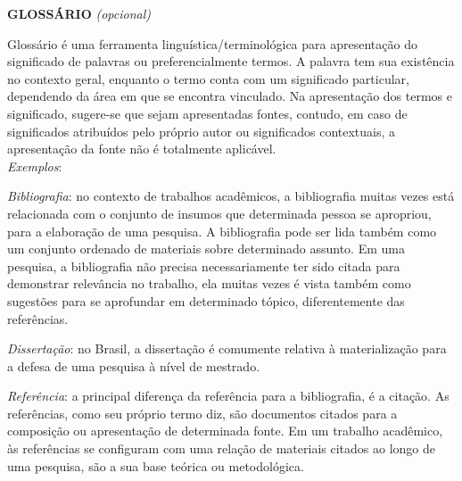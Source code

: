     \setlength{\parindent}{0pt}
    \onehalfspacing
    \justifying
    
\noindent\textbf{GLOSSÁRIO} \textit{(opcional)}

Glossário é uma ferramenta linguística/terminológica para apresentação do significado de palavras ou preferencialmente termos. A palavra tem sua existência no contexto geral, enquanto o termo conta com um significado particular, dependendo da área em que se encontra vinculado. Na apresentação dos termos e significado, sugere-se que sejam apresentadas fontes, contudo, em caso de significados atribuídos pelo próprio autor ou significados contextuais, a apresentação da fonte não é totalmente aplicável.\\
\textit{Exemplos}:

\textit{Bibliografia}: no contexto de trabalhos acadêmicos, a bibliografia muitas vezes está relacionada com o conjunto de insumos que determinada pessoa se apropriou, para a elaboração de uma pesquisa. A bibliografia pode ser lida também como um conjunto ordenado de materiais sobre determinado assunto. Em uma pesquisa, a bibliografia não precisa necessariamente ter sido citada para demonstrar relevância no trabalho, ela muitas vezes é vista também como sugestões para se aprofundar em determinado tópico, diferentemente das referências.

\textit{Dissertação}: no Brasil, a dissertação é comumente relativa à materialização para a defesa de uma pesquisa à nível de mestrado.

\textit{Referência}: a principal diferença da referência para a bibliografia, é a citação. As referências, como seu próprio termo diz, são documentos citados para a composição ou apresentação de determinada fonte. Em um trabalho acadêmico, às referências se configuram com uma relação de materiais citados ao longo de uma pesquisa, são a sua base teórica ou metodológica.
